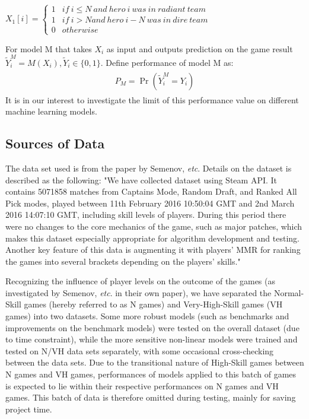 \documentclass{article}
\begin{document}
\begin{center}
$X _ { 1 } [ i ] = \left\{\begin{matrix}
1 & if\ i\leq N\ and\ hero\ i\ was\ in\ radiant\ team \\ 
1 & if\ i> N and\ hero\ i-N\ was\ in\ dire\ team\\ 
0 & otherwise
\end{matrix}\right.$
\end{center}
For model M that takes $X_i$ as input and outputs prediction on the game result $\tilde { Y } _ { i } ^ { M } = M \left( X _ { i } \right) , \tilde { Y } _ { i } \in \{ 0,1 \}$. Define performance of model M as:
\begin{align} 
\begin{split}
  P _ { M } = \operatorname { Pr } \left( \tilde { Y } _ { i } ^ { M } = Y _ { i } \right)
\end{split}         
\end{align}
It is in our interest to investigate the limit of this performance value on different machine learning models.




\subsection{Sources of Data}
The data set used is from the paper by Semenov, \textit{etc}. \cite{semenov2016performance}  Details on the dataset is described as the following: 
"We have collected dataset using Steam API. It contains 5071858 matches from Captains Mode, Random Draft, and Ranked All Pick modes, played between 11th February 2016 10:50:04 GMT and 2nd March 2016 14:07:10 GMT, including skill levels of players. During this period there were no changes to the core mechanics of the game, such as major patches, which makes this dataset especially appropriate for algorithm development and testing. Another key feature of this data is augmenting it with players’ MMR for ranking the games into several brackets depending on the players’ skills."

Recognizing the influence of player levels on the outcome of the games (as investigated by Semenov, \textit{etc}. in their own paper), we have separated the Normal-Skill games (hereby referred to as N games) and Very-High-Skill games (VH games) into two datasets. Some more robust models (such as benchmarks and improvements on the benchmark models) were tested on the overall dataset (due to time constraint), while the more sensitive non-linear models were trained and tested on N/VH data sets separately, with some occasional cross-checking between the data sets.
Due to the transitional nature of High-Skill games between N games and VH games, performances of models applied to this batch of games is expected to lie within their respective performances on N games and VH games. This batch of data is therefore omitted during testing, mainly for saving project time. 
\end{document}
